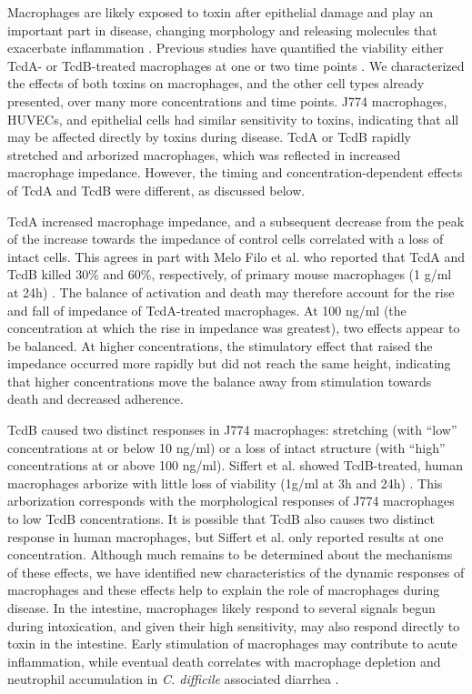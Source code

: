 Macrophages are likely exposed to toxin after epithelial damage 
and play an important part in disease, changing morphology 
and releasing molecules that exacerbate inflammation \cite{Linevsky:1997wt,Rocha:1998ua}. 
Previous studies have quantified the viability either TcdA- 
or TcdB-treated macrophages at one or two time points \cite{Siffert:1993ue,MeloFilho:1997ws,He:2009bs}. 
We characterized the effects of both toxins on macrophages, 
and the other cell types already presented, over many more 
concentrations and time points. J774 macrophages, HUVECs, 
and epithelial cells had similar sensitivity to toxins, 
indicating that all may be affected directly by toxins 
during disease. TcdA or TcdB rapidly stretched and 
arborized macrophages, which was reflected in increased 
macrophage impedance. However, the timing and 
concentration-dependent effects of TcdA and TcdB were 
different, as discussed below.

TcdA increased macrophage impedance, and a subsequent 
decrease from the peak of the increase towards the impedance 
of control cells correlated with a loss of intact cells. 
This agrees in part with Melo Filo et al. who reported 
that TcdA and TcdB killed 30\% and 60\%, respectively, 
of primary mouse macrophages (1 \textmugreek{}g/ml at 24h) \cite{MeloFilho:1997ws}. The 
balance of activation and death may therefore account for 
the rise and fall of impedance of TcdA-treated macrophages. 
At 100 ng/ml (the concentration at which the rise in 
impedance was greatest), two effects appear to be balanced. 
At higher concentrations, the stimulatory effect that 
raised the impedance occurred more rapidly but did not 
reach the same height, indicating that higher concentrations 
move the balance away from stimulation towards death and 
decreased adherence.

TcdB caused two distinct responses in J774 macrophages: 
stretching (with ``low'' concentrations at or below 10 ng/ml) 
or a loss of intact structure (with ``high'' concentrations 
at or above 100 ng/ml). Siffert et al. showed TcdB-treated, 
human macrophages arborize with little loss of viability 
(1\textmugreek{}g/ml at 3h and 24h) \cite{Siffert:1993ue}. This arborization 
corresponds with the morphological responses of J774 
macrophages to low TcdB concentrations. It is possible 
that TcdB also causes two distinct response in human 
macrophages, but Siffert et al. only reported results at 
one concentration. Although much remains to be determined 
about the mechanisms of these effects, we have identified 
new characteristics of the dynamic responses of 
macrophages and these effects help to explain the 
role of macrophages during disease. In the intestine, 
macrophages likely respond to several signals begun during 
intoxication, and given their high sensitivity, may 
also respond directly to toxin in the intestine. Early 
stimulation of macrophages may contribute to acute 
inflammation, while eventual death correlates with 
macrophage depletion and neutrophil accumulation in 
\textit{C. difficile} associated diarrhea \cite{Johal:2004jq}.

